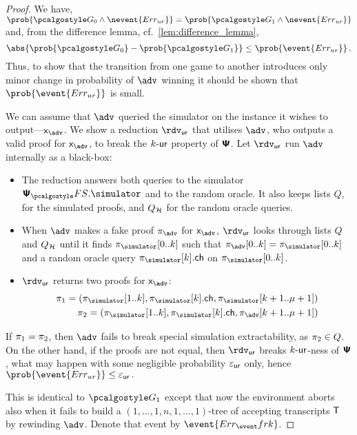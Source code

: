 \documentclass[runningheads,11pt]{llncs}
\begin{document}
\begin{proof}
   We have, \( \prob{\game{0} \land
    \nevent{\errur}} = \prob{\game{1} \land \nevent{\errur}} \) and, from the
  difference lemma, cf.~\cref{lem:difference_lemma},
  \[ \abs{\prob{\game{0}} - \prob{\game{1}}} \leq \prob{\event{\errur}}\,. \]
  Thus, to show that the transition from one game to another introduces only
  minor change in probability of $\advse$ winning it should be shown that
  $\prob{\event{\errur}}$ is small.

  We can assume that $\advse$ queried the simulator on the instance it wishes to
  output---$\inp_{\advse}$. We show a reduction $\rdvur$ that utilises $\advse$,
  who outputs a valid proof for $\inp_{\advse}$, to break the ${k\text{-}\mathsf{ur}}$ property of
  $\bm{\mathsf{\Psi}}$. Let $\rdvur$ run $\advse$ internally as a black-box:
\begin{itemize}
	\item The reduction answers both queries to the simulator $\psfs.\simulator$ and to the random oracle. 
	It also keeps lists $Q$, for the simulated proofs, and $Q_{\mathcal{H}}$ for the random oracle queries. 
\item When $\advse$ makes a fake proof $\zkproof_{\advse}$ for $\inp_{\advse}$,
  $\rdvur$ looks through lists $Q$ and $Q_{\mathcal{H}}$ until it finds
  $\zkproof_{\simulator}[0..k]$ such that
  $\zkproof_{\advse}[0..k] = \zkproof_{\simulator}[0..k]$
  and a random oracle query $\zkproof_{\simulator}[k].\ch$ on
  $\zkproof_{\simulator}[0..k]$.
	\item $\rdvur$ returns two proofs for $\inp_{\advse}$:
	\begin{align*}
		\zkproof_1 = (\zkproof_{\simulator}[1..k],
		\zkproof_{\simulator}[k].\ch, \zkproof_{\simulator}[k + 1..\mu + 1])\\
		\zkproof_2 = (\zkproof_{\simulator}[1..k],
		\zkproof_{\simulator}[k].\ch, \zkproof_{\advse}[k + 1..\mu + 1])
	\end{align*}
	\end{itemize}  
	If $\pi_1 = \pi_2$, then $\advse$ fails to break special simulation
  extractability, as $\pi_2 \in Q$. On the other hand, if the proofs are
  not equal, then $\rdvur$ breaks ${k\text{-}\mathsf{ur}}$-ness of $\bm{\mathsf{\Psi}}$, what may happen with
  some negligible probability $\varepsilon_{\mathsf{ur}}$ only, hence \( \prob{\event{\errur}} \leq
  \epsur\,. \)
	
   This is identical to $\game{1}$ except that now the environment
  aborts also when it fails to build a $(1, \ldots, 1, n, 1, \ldots, 1)$-tree
  of accepting transcripts $\mathsf{T}$ by rewinding $\advse$. Denote that event by
  $\event{\errfrk}$. 


\end{proof}
\end{document}
